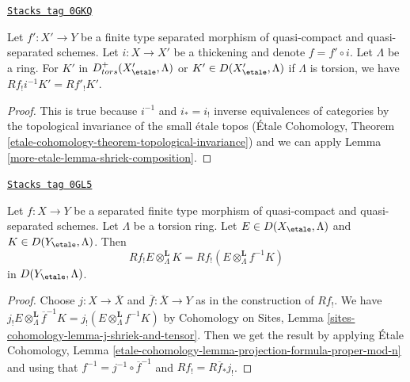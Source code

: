 \begin{lemma}
\label{more-etale-lemma-shriek-and-thickening}
\href{https://stacks.math.columbia.edu/tag/0GKQ}{\texttt{Stacks tag 0GKQ}}

Let $f' : X' \to Y$ be a finite type separated morphism of quasi-compact and
quasi-separated schemes. Let $i : X \to X'$ be a thickening and
denote $f = f' \circ i$. Let $\Lambda$ be a ring.
For $K'$ in $D^+_{tors}(X'_\etale, \Lambda)$ or $K' \in D(X'_\etale, \Lambda)$
if $\Lambda$ is torsion, we have $Rf_!i^{-1}K' = Rf'_!K'$.
\end{lemma}

\begin{proof}
This is true because $i^{-1}$ and $i_* = i_!$ inverse equivalences
of categories by the topological invariance of the small \'etale topos
(\'Etale Cohomology, Theorem
\ref{etale-cohomology-theorem-topological-invariance})
and we can apply
Lemma \ref{more-etale-lemma-shriek-composition}.
\end{proof}

\begin{lemma}
\label{more-etale-lemma-projection-formula-Rf-lower-shriek}
\href{https://stacks.math.columbia.edu/tag/0GL5}{\texttt{Stacks tag 0GL5}}

Let $f : X \to Y$ be a separated finite type morphism of quasi-compact
and quasi-separated schemes. Let $\Lambda$ be a torsion ring. Let
$E \in D(X_\etale, \Lambda)$ and $K \in D(Y_\etale, \Lambda)$. Then
$$
Rf_!E \otimes_\Lambda^\mathbf{L} K =
Rf_!(E \otimes_\Lambda^\mathbf{L} f^{-1}K)
$$
in $D(Y_\etale, \Lambda)$.
\end{lemma}

\begin{proof}
Choose $j : X \to \overline{X}$ and $\overline{f} : \overline{X} \to Y$
as in the construction of $Rf_!$. We have
$j_!E \otimes_\Lambda^\mathbf{L} \overline{f}^{-1}K =
j_!(E \otimes_\Lambda^\mathbf{L} f^{-1}K)$ by
Cohomology on Sites, Lemma \ref{sites-cohomology-lemma-j-shriek-and-tensor}.
Then we get the result by applying
\'Etale Cohomology, Lemma
\ref{etale-cohomology-lemma-projection-formula-proper-mod-n}
and using that $f^{-1} = j^{-1} \circ \overline{f}^{-1}$ and
$Rf_! = R\overline{f}_*j_!$.
\end{proof}

